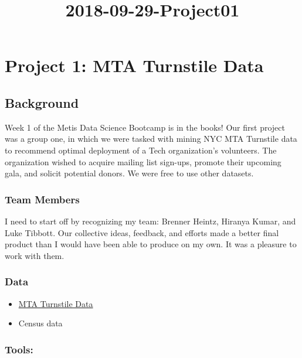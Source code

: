 \documentclass[11pt]{article}
\title{2018-09-29-Project01}
\providecommand{\tightlist}{%
      \setlength{\itemsep}{0pt}\setlength{\parskip}{0pt}}
\begin{document}
    
    
    \maketitle
    
    

    
    \section{Project 1: MTA Turnstile
Data}\label{project-1-mta-turnstile-data}

    \subsection{Background}\label{background}

Week 1 of the Metis Data Science Bootcamp is in the books! Our first
project was a group one, in which we were tasked with mining NYC MTA
Turnstile data to recommend optimal deployment of a Tech organization's
volunteers. The organization wished to acquire mailing list sign-ups,
promote their upcoming gala, and solicit potential donors. We were free
to use other datasets.

\subsubsection{Team Members}\label{team-members}

I need to start off by recognizing my team: Brenner Heintz, Hiranya
Kumar, and Luke Tibbott. Our collective ideas, feedback, and efforts
made a better final product than I would have been able to produce on my
own. It was a pleasure to work with them.

\subsubsection{Data}\label{data}

\begin{itemize}
\tightlist
\item
  \href{http://web.mta.info/developers/turnstile.html}{MTA Turnstile
  Data}
\item
  Census data
\end{itemize}

\subsubsection{Tools:}\label{tools}
\end{document}
